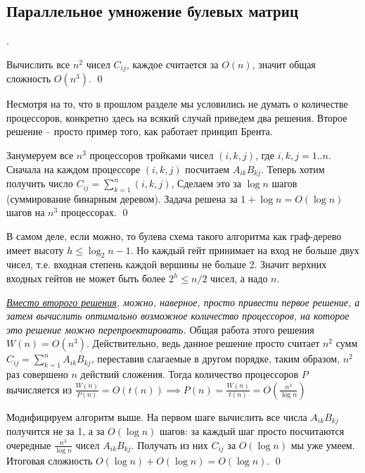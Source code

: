 \subsection{Параллельное умножение булевых матриц}

.

 Вычислить все $n^2$ чисел $C_{ij}$, каждое считается за $O(n)$, значит общая сложность $O(n^3)$.  \qed

Несмотря на то, что в прошлом разделе мы условились не думать о количестве процессоров, конкретно здесь на всякий случай приведем два решения. Второе решение -- просто пример того, как работает принцип Брента. 

 Занумеруем все $n^3$ процессоров тройками чисел $(i, k, j)$, где $i,k,j=1..n$. Сначала на каждом процессоре $(i, k, j)$ посчитаем $A_{ik}B_{kj}$. Теперь хотим получить число $C_{ij} = \sum_{k=1}^n (i, k, j)$, Сделаем это за $\log n$ шагов (суммирование бинарным деревом). Задача решена за $1+\log n = O(\log n) $ шагов на $n^3$ процессорах. \qed

 В самом деле, если можно, то булева схема такого алгоритма как граф-дерево имеет высоту $h \leq \log_2 n - 1$. Но каждый гейт принимает на вход не больше двух чисел, т.е. входная степень каждой вершины не больше 2. Значит верхних входных гейтов не может быть более $2^h \leq n/2$  чисел, а надо $n$.

\textit{\underline{Вместо второго решения}, можно, наверное, просто привести первое решение, а затем вычислить оптимально возможное количество процессоров, на которое это решение можно перепроектировать.} Общая работа этого решения $W(n) = O(n^3)$. Действительно, ведь данное решение просто считает $n^2$ сумм $C_{ij} = \sum_{k=1}^n A_{ik}B_{kj}$, переставив слагаемые в другом порядке, таким образом, $n^2$ раз совершено $n$ действий сложения. Тогда количество процессоров $P$ вычисляется из $\frac{W(n)}{P(n)} = O(t(n)) \implies P(n) = \frac{W(n)}{t(n)} = O\left(\frac{n^3}{\log n}\right)$

 Модифицируем алгоритм выше. На первом шаге вычислить все числа $A_{ik}B_{kj}$ получится не за 1, а за $O(\log n)$ шагов: за каждый шаг просто посчитаются очередные $\frac{n^3}{\log n}$ чисел $A_{ik}B_{kj}$. Получать из них $C_{ij}$ за $O(\log n)$ мы уже умеем. Итоговая сложность $O(\log n) + O(\log n) = O(\log n)$.  \qed

